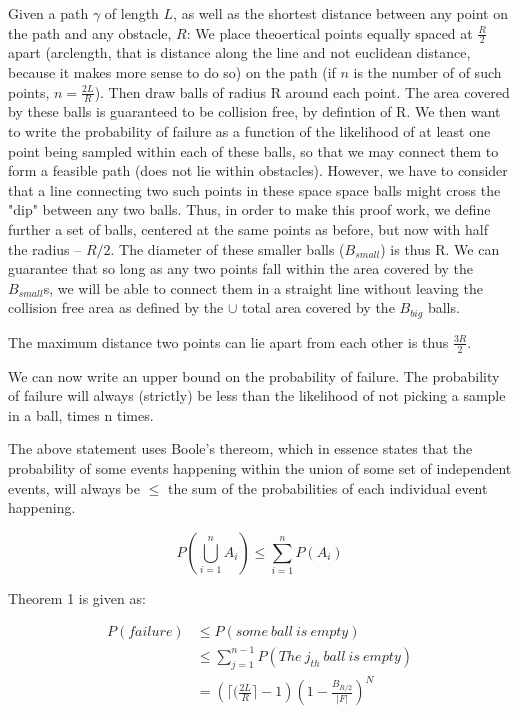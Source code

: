 \documentclass[a4paper]{article}
\begin{document}
Given a path $\gamma$ of length $L$, as well as the shortest distance between
any point on the path and any obstacle, $R$: 
We place theoertical points equally spaced at $\frac{R}{2}$ apart (arclength, that is
distance along the line and not euclidean distance, because it makes more sense
to do so) on the path (if $n$ is the number of of such points, $n =
\frac{2L}{R}$). Then draw balls of radius R around each point. The area covered
by these balls is guaranteed to be collision free, by defintion of R. We then
want to write the probability of failure as a function of the likelihood of
at least one point being sampled within each of these balls, so that we may
connect them to form a feasible path (does not lie within obstacles). However,
we have to consider that a line connecting two such points in these space
space balls might cross the "dip" between any two balls. Thus, in order to make
this proof work, we define further a set of balls, centered at the same points
as before, but now with half the radius  -- $R/2$. The diameter of these smaller
balls ($B_{small}$) is thus R. We can guarantee that so long as any two points
fall within the area covered by the $B_{small}$s, we will be able to connect them in a straight line without leaving the collision free area as defined by the $\cup$ total area covered by the $B_{big}$ balls.  

The maximum distance two points can lie apart from each other is thus
$\frac{3R}{2}$. 

We can now write an upper bound on the probability of failure. The probability
of failure will always (strictly) be less than the likelihood of not picking a
sample in a ball, times n times. 

The above statement uses Boole's thereom, which in essence
states that the probability of some events happening within the union of some
set of independent events, will always be $\leq$ the sum of the probabilities of
each individual event happening.


\begin{equation}
    P\left(\bigcup_{i=1}^{n}A_i\right) \leq \sum_{i=1}^{n} P(A_i)
\end{equation}

Theorem 1 is given as:

\begin{equation}
\begin{align*}
    P(failure) &\leq P(some\ ball\ is\ empty) \\
        &\leq \sum_{j=1}^{n-1} P(The\ j_{th}\ ball\ is\ empty) \\
        &= \left(\lceil(\frac{2L}{R}\rceil-1\right) \left(1-\frac{B_{R/2}}{|F|}\right)^N
\end{align*}
\end{equation}
\end{document}
